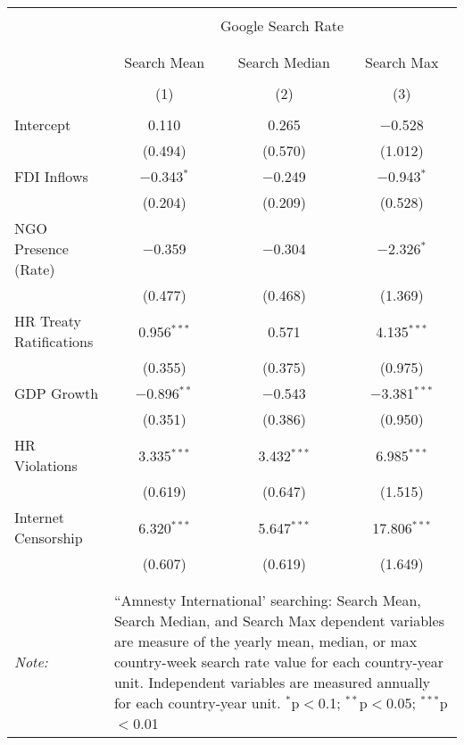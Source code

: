 
\begin{table}[!htbp] \centering 
  \caption{} 
  \label{} 
\begin{tabular}{@{\extracolsep{5pt}}lccc} 
\\[-1.8ex]\hline 
\hline \\[-1.8ex] 
 & \multicolumn{3}{c}{Google Search Rate} \\ 
\cline{2-4} 
\\[-1.8ex] & \multicolumn{3}{c}{ } \\ 
 & Search Mean & Search Median & Search Max \\ 
\\[-1.8ex] & (1) & (2) & (3)\\ 
\hline \\[-1.8ex] 
 Intercept & 0.110 & 0.265 & $-$0.528 \\ 
  & (0.494) & (0.570) & (1.012) \\ 
  FDI Inflows & $-$0.343$^{*}$ & $-$0.249 & $-$0.943$^{*}$ \\ 
  & (0.204) & (0.209) & (0.528) \\ 
  NGO Presence (Rate) & $-$0.359 & $-$0.304 & $-$2.326$^{*}$ \\ 
  & (0.477) & (0.468) & (1.369) \\ 
  HR Treaty Ratifications & 0.956$^{***}$ & 0.571 & 4.135$^{***}$ \\ 
  & (0.355) & (0.375) & (0.975) \\ 
  GDP Growth & $-$0.896$^{**}$ & $-$0.543 & $-$3.381$^{***}$ \\ 
  & (0.351) & (0.386) & (0.950) \\ 
  HR Violations & 3.335$^{***}$ & 3.432$^{***}$ & 6.985$^{***}$ \\ 
  & (0.619) & (0.647) & (1.515) \\ 
  Internet Censorship & 6.320$^{***}$ & 5.647$^{***}$ & 17.806$^{***}$ \\ 
  & (0.607) & (0.619) & (1.649) \\ 
 \hline \\[-1.8ex] 
\hline 
\hline \\[-1.8ex] 
\textit{Note:}  & \multicolumn{3}{l}{\parbox[t]{8cm}{``Amnesty International' searching: Search Mean, Search Median, and Search Max dependent variables are measure of the yearly mean, median, or max country-week search rate value for each country-year unit. Independent variables are measured annually for each country-year unit. $^{*}$p$<$0.1; $^{**}$p$<$0.05; $^{***}$p$<$0.01}} \\ 
\end{tabular} 
\end{table} 
